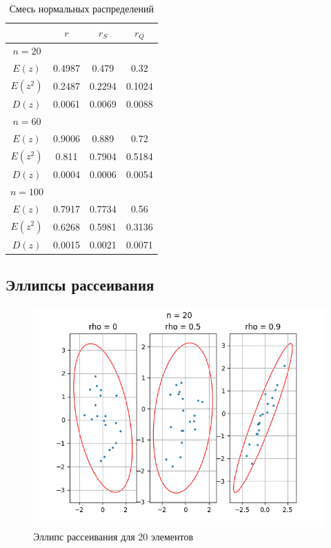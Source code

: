 \documentclass[12pt,a4paper]{article}
\begin{document}
\begin{table}[H]
    \centering
    \begin{tabular}{|c|c|c|c|}
        \hline
        & $r$ & $r_S$ & $r_Q$\\\hline
        $n=20$ & & &\\\hline
        $E(z)$ & 0.4987 & 0.479 & 0.32\\\hline
        $E(z^2)$ & 0.2487 & 0.2294 & 0.1024\\\hline
        $D(z)$ & 0.0061 & 0.0069 & 0.0088\\\hline
        \hline
        $n=60$ & & &\\\hline
        $E(z)$ & 0.9006 & 0.889 & 0.72\\\hline
        $E(z^2)$ & 0.811 & 0.7904 & 0.5184\\\hline
        $D(z)$ & 0.0004 & 0.0006 & 0.0054\\\hline
        \hline
        $n=100$ & & &\\\hline
        $E(z)$ & 0.7917 & 0.7734 & 0.56\\\hline
        $E(z^2)$ & 0.6268 & 0.5981 & 0.3136\\\hline
        $D(z)$ & 0.0015 & 0.0021 & 0.0071\\\hline
    \end{tabular}
    \caption{Смесь нормальных распределений}
\end{table}

\subsection{Эллипсы рассеивания}
\begin{figure}[H]
    \centering
    \includegraphics[scale=0.85]{images/ellipses20.png}
    \caption{Эллипс рассеивания для 20 элементов}
\end{figure}
\end{document}
